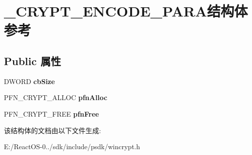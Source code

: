 \hypertarget{struct___c_r_y_p_t___e_n_c_o_d_e___p_a_r_a}{}\section{\+\_\+\+C\+R\+Y\+P\+T\+\_\+\+E\+N\+C\+O\+D\+E\+\_\+\+P\+A\+R\+A结构体 参考}
\label{struct___c_r_y_p_t___e_n_c_o_d_e___p_a_r_a}
\subsection*{Public 属性}
\begin{DoxyCompactItemize}
\item 
\mbox{\label{struct___c_r_y_p_t___e_n_c_o_d_e___p_a_r_a_a359f26aa79fd318fffe0c7b57f464647}} 
D\+W\+O\+RD {\bfseries cb\+Size}
\item 
\mbox{\label{struct___c_r_y_p_t___e_n_c_o_d_e___p_a_r_a_a1de42f0d2ff9b6e7d45058af0928eaaa}} 
P\+F\+N\+\_\+\+C\+R\+Y\+P\+T\+\_\+\+A\+L\+L\+OC {\bfseries pfn\+Alloc}
\item 
\mbox{\label{struct___c_r_y_p_t___e_n_c_o_d_e___p_a_r_a_aceb010b3d88906fc32c9ecb364da5f75}} 
P\+F\+N\+\_\+\+C\+R\+Y\+P\+T\+\_\+\+F\+R\+EE {\bfseries pfn\+Free}
\end{DoxyCompactItemize}


该结构体的文档由以下文件生成\+:\begin{DoxyCompactItemize}
\item 
E\+:/\+React\+O\+S-\/0../sdk/include/psdk/wincrypt.\+h\end{DoxyCompactItemize}
